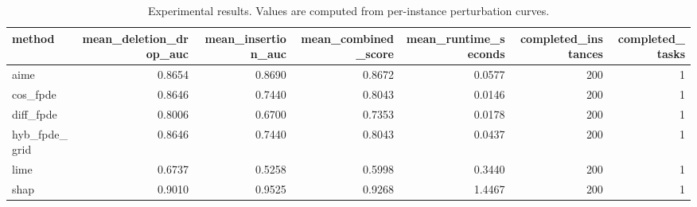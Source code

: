 \begin{table}[t]
\caption{Experimental results. Values are computed from per-instance perturbation curves.}
\label{tab:main_results_computed}
\centering
\begin{tabular}{lrrrrrr}
\toprule
method & mean\_deletion\_drop\_auc & mean\_insertion\_auc & mean\_combined\_score & mean\_runtime\_seconds & completed\_instances & completed\_tasks \\
\midrule
aime & 0.8654 & 0.8690 & 0.8672 & 0.0577 & 200 & 1 \\
cos\_fpde & 0.8646 & 0.7440 & 0.8043 & 0.0146 & 200 & 1 \\
diff\_fpde & 0.8006 & 0.6700 & 0.7353 & 0.0178 & 200 & 1 \\
hyb\_fpde\_grid & 0.8646 & 0.7440 & 0.8043 & 0.0437 & 200 & 1 \\
lime & 0.6737 & 0.5258 & 0.5998 & 0.3440 & 200 & 1 \\
shap & 0.9010 & 0.9525 & 0.9268 & 1.4467 & 200 & 1 \\
\bottomrule
\end{tabular}

\end{table}
